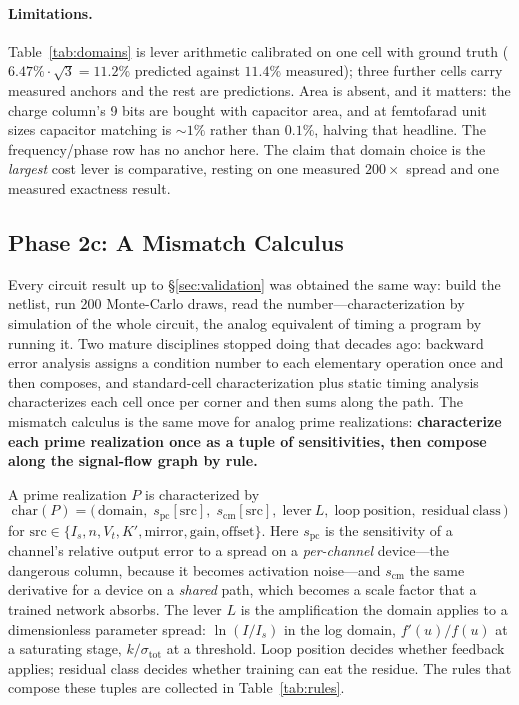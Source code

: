 \documentclass[11pt]{article}
\begin{document}
\paragraph{Limitations.} Table~\ref{tab:domains} is lever arithmetic calibrated on one cell with ground truth ($6.47\%\cdot\sqrt3 = 11.2\%$ predicted against $11.4\%$ measured); three further cells carry measured anchors and the rest are predictions. Area is absent, and it matters: the charge column's 9 bits are bought with capacitor area, and at femtofarad unit sizes capacitor matching is ${\sim}1\%$ rather than $0.1\%$, halving that headline. The frequency/phase row has no anchor here. The claim that domain choice is the \textit{largest} cost lever is comparative, resting on one measured $200\times$ spread and one measured exactness result.

\subsection{Phase 2c: A Mismatch Calculus}
\label{sec:calculus}

Every circuit result up to \S\ref{sec:validation} was obtained the same way: build the netlist, run 200 Monte-Carlo draws, read the number---characterization by simulation of the whole circuit, the analog equivalent of timing a program by running it. Two mature disciplines stopped doing that decades ago: backward error analysis assigns a condition number to each elementary operation once and then composes, and standard-cell characterization plus static timing analysis characterizes each cell once per corner and then sums along the path. The mismatch calculus is the same move for analog prime realizations: \textbf{characterize each prime realization once as a tuple of sensitivities, then compose along the signal-flow graph by rule.}

A prime realization $P$ is characterized by
\[
\mathrm{char}(P) = \big(\,\mathrm{domain},\; s_{\mathrm{pc}}[\mathrm{src}],\; s_{\mathrm{cm}}[\mathrm{src}],\; \mathrm{lever}\ L,\; \mathrm{loop\ position},\; \mathrm{residual\ class}\,\big)
\]
for $\mathrm{src} \in \{I_s, n, V_t, K', \mathrm{mirror}, \mathrm{gain}, \mathrm{offset}\}$. Here $s_{\mathrm{pc}}$ is the sensitivity of a channel's relative output error to a spread on a \textit{per-channel} device---the dangerous column, because it becomes activation noise---and $s_{\mathrm{cm}}$ the same derivative for a device on a \textit{shared} path, which becomes a scale factor that a trained network absorbs. The lever $L$ is the amplification the domain applies to a dimensionless parameter spread: $\ln(I/I_s)$ in the log domain, $f'(u)/f(u)$ at a saturating stage, $k/\sigma_{\mathrm{tot}}$ at a threshold. Loop position decides whether feedback applies; residual class decides whether training can eat the residue. The rules that compose these tuples are collected in Table~\ref{tab:rules}.
\end{document}
